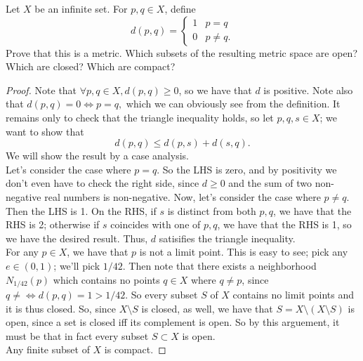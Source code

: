 \documentclass{assignment}
\begin{document}
\begin{question}[10]
  Let $X$ be an infinite set. For $p, q \in X$, define 
$$d(p,q) = \begin{cases} 1 &p = q \\ 0 &p\neq q.\end{cases}$$
Prove that this is a metric. Which subsets of the resulting metric space are open? Which are closed?
Which are compact?
\end{question}
\begin{proof}
  Note that $\forall p,q\in X, d(p,q) \geq 0$, so we have that $d$ is positive. Note also that $d(p,
q) = 0 \iff p = q,$ which we can obviously see from the definition. It remains only to check that the 
triangle inequality holds, so let $p,q,s\in X$; we want to show that $$d(p,q) \leq d(p,s) + d(s,q).$$
We will show the result by a case analysis.  \\

Let's consider the case where $p=q$. So the LHS is zero, and by positivity we don't even have 
to check the right side, since $d \geq 0$ and the sum of two non-negative real numbers is non-negative.
Now, let's consider the case where $p\neq q$. Then the LHS is 1. On the RHS, if $s$ is distinct from
both $p,q$, we have that the RHS is 2; otherwise if $s$ coincides with one of $p,q$, we have that the
RHS is 1, so we have the desired result. Thus, $d$ satisifies the triangle inequality. \\

For any $p\in X$, we have that $p$ is not a limit point. This is easy to see; pick any $e\in(0,1)$;
we'll pick $1/42$. Then note that there exists a neighborhood $N_{1/42}(p)$ which contains no points
$q\in X$ where $q\neq p$, since $q\neq \iff d(p,q) = 1 > 1/42$. So every subset $S$ of $X$ contains 
no limit points and it is thus closed. So, since $X \setminus S$ is closed, as well, we have that 
$S = X \setminus (X\setminus S)$ is open, since a set is closed iff its complement is open. So by 
this arguement, it must be that in fact every subset $S\subset X$ is open. \\

Any finite subset of $X$ is compact. 
\end{proof}
\end{document}
